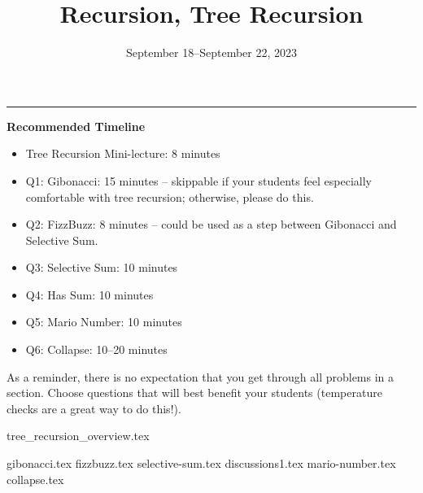 \documentclass{exam}
\title{Recursion, Tree Recursion}
\date{September 18--September 22, 2023}
\begin{document}
\maketitle
\rule{\textwidth}{0.15em}
\fontsize{12}{15}\selectfont

\begin{meta}
\textbf{Recommended Timeline}
\begin{itemize}
    \item Tree Recursion Mini-lecture: 8 minutes
    \item Q1: Gibonacci: 15 minutes -- skippable if your students feel especially comfortable with tree recursion; otherwise, please do this.
    \item Q2: FizzBuzz: 8 minutes -- could be used as a step between Gibonacci and Selective Sum.
    \item Q3: Selective Sum: 10 minutes
    \item Q4: Has Sum: 10 minutes
    \item Q5: Mario Number: 10 minutes
    \item Q6: Collapse: 10--20 minutes
\end{itemize}
As a reminder, there is no expectation that you get through all problems in a section. Choose questions that will best benefit your students (temperature checks are a great way to do this!).
\end{meta}

{tree_recursion_overview.tex}
\begin{questions}
    {gibonacci.tex}
    {fizzbuzz.tex}
    {selective-sum.tex}
    {discussions1.tex} 
    {mario-number.tex}
    {collapse.tex}
\end{questions}
\end{document}
